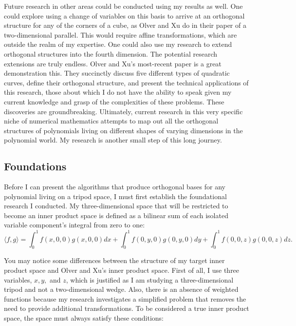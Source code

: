 \documentclass[letterpaper, 12pt]{article}
\begin{document}
Future research in other areas could be conducted using my results as well. One could explore using a change of variables on this basis to arrive at an orthogonal structure for any of the corners of a cube, as Olver and Xu do in their paper of a two-dimensional parallel. This would require affine transformations, which are outside the realm of my expertise. One could also use my research to extend orthogonal structures into the fourth dimension. The potential research extensions are truly endless. Olver and Xu's most-recent paper is a great demonstration this. They succinctly discuss five different types of quadratic curves, define their orthogonal structure, and present the technical applications of this research, those about which I do not have the ability to speak given my current knowledge and grasp of the complexities of these problems. These discoveries are groundbreaking. Ultimately, current research in this very specific niche of numerical mathematics attempts to map out all the orthogonal structures of polynomials living on different shapes of varying dimensions in the polynomial world. My research is another small step of this long journey.  







\newpage
\begin{centering}\section{Foundations}\end{centering}

Before I can present the algorithms that produce orthogonal bases for any polynomial living on a tripod space, I must first establish the foundational research I conducted. My three-dimensional space that will be restricted to become an inner product space is defined as a bilinear sum of each isolated variable component's integral from zero to one: $$\langle f, g\rangle = \int_0^1 f(x,0,0)g(x,0,0) dx + \int_0^1 f(0,y,0)g(0,y,0) dy + \int_0^1 f(0,0,z)g(0,0,z) dz.$$

\noindent You may notice some differences between the structure of my target inner product space and Olver and Xu's inner product space. First of all, I use three variables, $x, y,$ and $z$, which is justified as I am studying a three-dimensional tripod and not a two-dimensional wedge. Also, there is an absence of weighted functions because my research investigates a simplified problem that removes the need to provide additional transformations. To be considered a true inner product space, the space must always satisfy these conditions:
\end{document}

